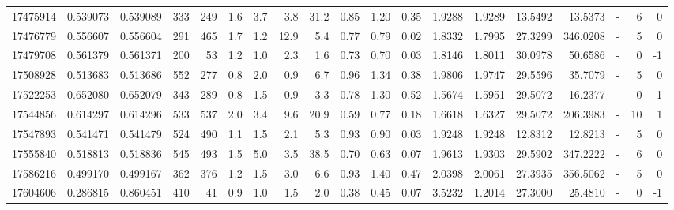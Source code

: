 \begin{tabular}{rrrrrrrrrrrrrrrrlrr}
  17475914 & 0.539073 &   0.539089 &  333 &  249 &      1.6 &      3.7 &     3.8 &     31.2 &       0.85 &        1.20 &        0.35 &  1.9288 &  1.9289 &   13.5492 &   13.5373 &             - &        6 &          0 \\
  17476779 & 0.556607 &   0.556604 &  291 &  465 &      1.7 &      1.2 &    12.9 &      5.4 &       0.77 &        0.79 &        0.02 &  1.8332 &  1.7995 &   27.3299 &  346.0208 &             - &        5 &          0 \\
  17479708 & 0.561379 &   0.561371 &  200 &   53 &      1.2 &      1.0 &     2.3 &      1.6 &       0.73 &        0.70 &        0.03 &  1.8146 &  1.8011 &   30.0978 &   50.6586 &             - &        0 &         -1 \\
  17508928 & 0.513683 &   0.513686 &  552 &  277 &      0.8 &      2.0 &     0.9 &      6.7 &       0.96 &        1.34 &        0.38 &  1.9806 &  1.9747 &   29.5596 &   35.7079 &             - &        5 &          0 \\
  17522253 & 0.652080 &   0.652079 &  343 &  289 &      0.8 &      1.5 &     0.9 &      3.3 &       0.78 &        1.30 &        0.52 &  1.5674 &  1.5951 &   29.5072 &   16.2377 &             - &        0 &         -1 \\
  17544856 & 0.614297 &   0.614296 &  533 &  537 &      2.0 &      3.4 &     9.6 &     20.9 &       0.59 &        0.77 &        0.18 &  1.6618 &  1.6327 &   29.5072 &  206.3983 &             - &       10 &          1 \\
  17547893 & 0.541471 &   0.541479 &  524 &  490 &      1.1 &      1.5 &     2.1 &      5.3 &       0.93 &        0.90 &        0.03 &  1.9248 &  1.9248 &   12.8312 &   12.8213 &             - &        5 &          0 \\
  17555840 & 0.518813 &   0.518836 &  545 &  493 &      1.5 &      5.0 &     3.5 &     38.5 &       0.70 &        0.63 &        0.07 &  1.9613 &  1.9303 &   29.5902 &  347.2222 &             - &        6 &          0 \\
  17586216 & 0.499170 &   0.499167 &  362 &  376 &      1.2 &      1.5 &     3.0 &      6.6 &       0.93 &        1.40 &        0.47 &  2.0398 &  2.0061 &   27.3935 &  356.5062 &             - &        5 &          0 \\
  17604606 & 0.286815 &   0.860451 &  410 &   41 &      0.9 &      1.0 &     1.5 &      2.0 &       0.38 &        0.45 &        0.07 &  3.5232 &  1.2014 &   27.3000 &   25.4810 &             - &        0 &         -1 \\

\end{tabular}

